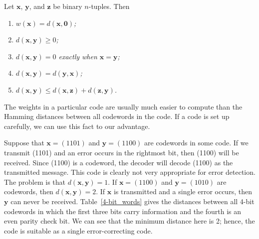 
\begin{proposition}
Let ${\mathbf x}$, ${\mathbf y}$, and ${\mathbf z}$ be binary $n$-tuples.
Then 
\begin{enumerate}
 
\rm \item \it
$w({\mathbf x}) = d( {\mathbf x}, {\mathbf 0})$; 
 
\rm \item \it
$d( {\mathbf x}, {\mathbf y}) \geq 0$; 
 
\rm \item \it
$d( {\mathbf x}, {\mathbf y}) = 0$ exactly when ${\mathbf x} = {\mathbf y}$; 
 
\rm \item \it
$d( {\mathbf x}, {\mathbf y})= d( {\mathbf y}, {\mathbf x})$; 
 
\rm \item \it
$d( {\mathbf x}, {\mathbf y}) \leq d( {\mathbf x}, {\mathbf z}) + d( {\mathbf
z}, {\mathbf y})$. 
 
\end{enumerate}
\end{proposition}
 
 
The weights in a particular code are usually much easier to compute
than the Hamming distances between all codewords in the code. If a
code is set up carefully, we can use this fact to our advantage.
 
 
Suppose that ${\mathbf x} = (1101)$ and ${\mathbf y} = (1100)$ are
codewords in some code. If we transmit (1101) and an error occurs in
the rightmost bit, then (1100) will be received. Since (1100) is a
codeword, the decoder will decode (1100) as the transmitted message.
This code is clearly not very appropriate for error detection. The
problem is that $d({\mathbf x}, {\mathbf y}) = 1$. If ${\mathbf x} = (1100)$
and ${\mathbf y} = (1010)$ are codewords, then $d({\mathbf x}, {\mathbf y})
= 2$. If ${\mathbf x}$ is transmitted and a single error occurs, then
${\mathbf y}$ can never be received. Table~\ref{4-bit_words} gives the distances
between all 4-bit codewords in which the first three bits carry
information and the fourth is an even parity check bit. We can see
that the minimum distance here is 2; hence, the code is suitable as
a single error-correcting code. 
 
